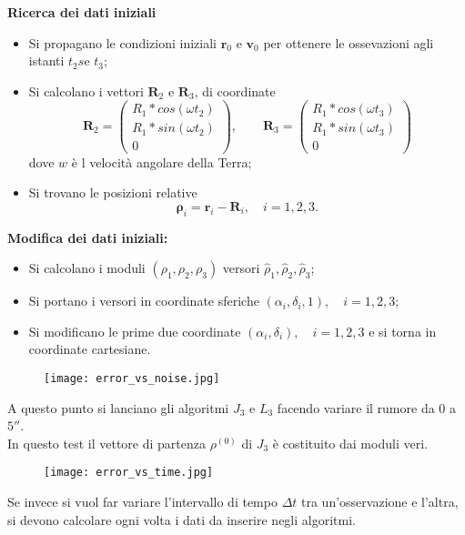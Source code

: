 \documentclass{beamer}
\begin{document}
\begin{frame}[plain]
\textbf{Ricerca dei dati iniziali}\begin{itemize}
\item Si propagano le condizioni iniziali $\textbf{r}_0$ e $\textbf{v}_0$ per ottenere le ossevazioni agli istanti $t_2s$e $t_3$;
\item Si calcolano i vettori $\textbf{R}_2$ e $\textbf{R}_3$, di coordinate \begin{equation}
\textbf{R}_2=\begin{pmatrix}
R_1*cos(\omega t_2) \\
R_1*sin(\omega t_2) \\
0
\end{pmatrix}
, \qquad \textbf{R}_3=\begin{pmatrix}
R_1*cos(\omega t_3) \\
R_1*sin(\omega t_3) \\
0
\end{pmatrix}
\end{equation}  
dove $w$ \`e l velocit\`a angolare della Terra; 
\item Si trovano le posizioni relative \begin{equation*}
\mathbf{\rho}_i=\textbf{r}_i-\textbf{R}_i, \quad i=1,2,3.
\end{equation*}
\end{itemize}
\end{frame}
\begin{frame}
\textbf{Modifica dei dati iniziali:}
\begin{itemize}
\item Si calcolano i moduli $(\rho_1, \rho_2, \rho_3)$ versori $\hat{\rho}_1,\hat{\rho}_2,\hat{\rho}_3$;
\item Si portano i versori in coordinate sferiche $(\alpha_i, \delta_i, 1), \quad i=1,2,3$;
\item Si modificano le prime due coordinate $(\alpha_i, \delta_i), \quad i=1,2,3$ e si torna in coordinate cartesiane.
\end{itemize}
\end{frame}
\begin{frame}[plain]

\begin{figure} 
\centering
\texttt{[image: error\_vs\_noise.jpg]} 
\end{figure}
A questo punto si lanciano gli algoritmi $J_3$ e $L_3$ facendo variare il rumore da $0$ a $5''$. \\
In questo test il vettore di partenza $\rho^{(0)}$ di $J_3$ \`e costituito dai moduli veri.
\end{frame}
\begin{frame}[plain]
\begin{figure} 
\centering
\texttt{[image: error\_vs\_time.jpg]} 
\end{figure}
Se invece si vuol far variare l'intervallo di tempo $\Delta t$ tra un'osservazione e l'altra, si devono calcolare ogni volta i dati da inserire negli algoritmi.
\end{frame}
\end{document}
